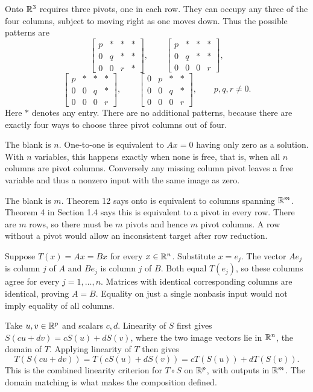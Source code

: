 Onto $\mathbb{R}^3$ requires three pivots, one in each row. They can
occupy any three of the four columns, subject to moving right
as one moves down. Thus the possible patterns are
\[
 \begin{bmatrix}p&*&*&*\\0&q&*&*\\0&0&r&*\end{bmatrix},\qquad
 \begin{bmatrix}p&*&*&*\\0&q&*&*\\0&0&0&r\end{bmatrix},
\]
\[
 \begin{bmatrix}p&*&*&*\\0&0&q&*\\0&0&0&r\end{bmatrix},\qquad
 \begin{bmatrix}0&p&*&*\\0&0&q&*\\0&0&0&r\end{bmatrix},
 \qquad p,q,r\ne0.
\]
Here $*$ denotes any entry. There are no additional patterns, because
there are exactly four ways to choose three pivot columns out of four.

The blank is $\boxed{n}$. One-to-one is equivalent to $Ax=0$
having only zero as a solution. With $n$ variables, this happens
exactly when none is free, that is, when all $n$ columns are pivot columns.
Conversely any missing column pivot leaves a free variable and thus
a nonzero input with the same image as zero.

The blank is $\boxed{m}$. Theorem 12 says onto is equivalent to
columns spanning $\mathbb{R}^m$. Theorem 4 in Section 1.4 says this is
equivalent to a pivot in every row. There are $m$ rows, so there
must be $m$ pivots and hence $m$ pivot columns. A row without a pivot
would allow an inconsistent target after row reduction.

Suppose $T(x)=Ax=Bx$ for every $x\in\mathbb{R}^n$. Substitute $x=e_j$.
The vector $Ae_j$ is column $j$ of $A$ and $Be_j$ is column $j$
of $B$. Both equal $T(e_j)$, so these columns agree for every
$j=1,\ldots,n$. Matrices with identical corresponding columns are
identical, proving $A=B$. Equality on just a single nonbasis input
would not imply equality of all columns.

Take $u,v\in\mathbb{R}^p$ and scalars $c,d$. Linearity of $S$ first gives
$S(cu+dv)=cS(u)+dS(v)$, where the two image vectors lie in
$\mathbb{R}^n$, the domain of $T$. Applying linearity of $T$ then gives
\[
 T(S(cu+dv))=T(cS(u)+dS(v))=cT(S(u))+dT(S(v)).
\]
This is the combined linearity criterion for $T\circ S$ on $\mathbb{R}^p$,
with outputs in $\mathbb{R}^m$. The domain matching is what makes the composition defined.

